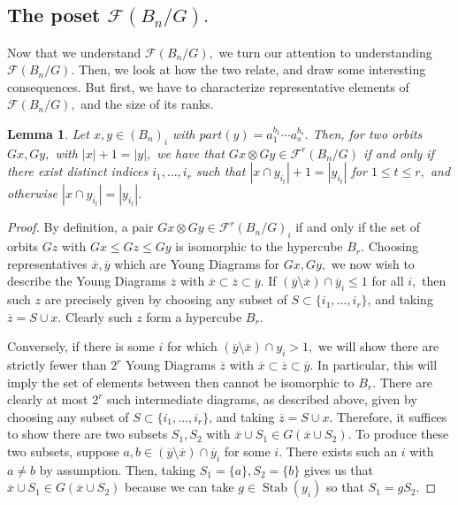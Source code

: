 \documentclass{amsart}
\newtheorem{lem}[thm]{Lemma}
\theoremstyle{remark}
\newcommand\ssec{\subsection}
\def\Stab{\operatorname{Stab}}
\begin{document}
\iffalse

\ssec{The poset $\mathcal F(B_n/G).$} Now that we understand $\mathcal F(B_n/G),$ we turn our attention to understanding $\mathcal F(B_n/G).$ Then, we look at how the two relate, and draw some interesting consequences. But first, we have to characterize representative elements of $\mathcal F(B_n/G),$ and the size of its ranks.

\begin{lem}
\label{lem:pairs_in_edge_poset}
Let $x,y \in (B_n)_i$ with $part(y)= a_1^{b_1}\cdots a_s^{b_s}.$ Then, for two orbits $Gx,Gy,$ with $|x|+1=|y|,$ we have that $Gx \otimes Gy \in \mathcal F^r(B_n/G)$ if and only if there exist distinct indices $i_1,\ldots, i_r$ such that $|x\cap y_{i_t}|+1 = |y_{i_t}|$ for $1 \leq t \leq r,$ and otherwise  $|x\cap y_{i_t}|= |y_{i_t}|.$
\end{lem}
\begin{proof}
By definition, a pair $Gx\otimes Gy\in \mathcal F^r(B_n/G)_i$ if and only if the set of orbits $Gz$ with $Gx \leq Gz \leq Gy$ is isomorphic to the hypercube $B_r.$ Choosing representatives $\overline{x},\overline{y}$ which are Young Diagrams for $Gx,Gy,$ we now wish to describe the Young Diagrams $\overline{z}$ with $\overline{x} \subset \overline{z} \subset \overline{y}.$ If $(\overline{y}\setminus \overline{x}) \cap \overline{y}_i \leq 1$ for all $i,$ then such $z$ are precisely given by choosing any subset of $S \subset \{i_1,\ldots, i_r\}$, and taking $\overline{z} = S \cup x.$ Clearly such $z$ form a hypercube $B_r.$

Conversely, if there is some $i$ for which $(\overline{y}\setminus \overline{x}) \cap y_i > 1,$ we will show there are strictly fewer than $2^r$ Young Diagrams $\overline{z}$ with $\overline{x}\subset \overline{z} \subset \overline{y}.$ In particular, this will imply the set of elements between then cannot be isomorphic to $B_r.$ There are clearly at most $2^r$ such intermediate diagrams, as described above, given by choosing any subset of $S \subset \{i_1,\ldots, i_r\}$, and taking $\overline{z} = S \cup x.$ Therefore, it suffices to show there are two subsets $S_1,S_2$ with $\overline{x}\cup S_1 \in G(\overline{x}\cup S_2).$ To produce these two subsets, suppose $a,b \in (\overline{y}\setminus \overline{x}) \cap \overline{y}_i$ for some $i$. There exists such an $i$ with $a \neq b$ by assumption. Then, taking $S_1 = \{a\},S_2=\{b\}$ gives us that $\overline{x}\cup S_1 \in G(\overline{x}\cup S_2)$ because we can take $g \in \Stab(y_i)$ so that $S_1 = gS_2.$
\end{proof}
\end{document}
